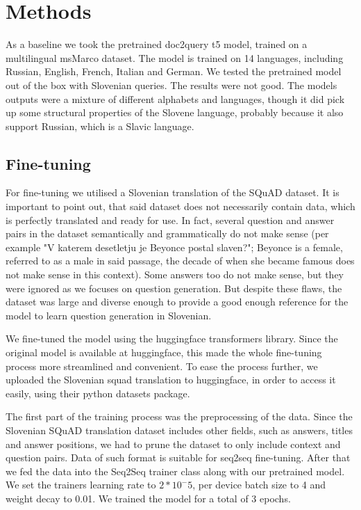 \documentclass[fleqn,moreauthors,10pt]{ds_report}
\makeatletter
\newcommand\setcurrentname[1]{\def\@currentlabelname{#1}}
\makeatother
\begin{document}

\section*{Methods} 
\setcurrentname{Methods}
\label{methods} %

As a baseline we took the pretrained doc2query t5 model, trained on a multilingual msMarco dataset\cite{msmarcomodel}. The model is trained on 14 languages, including Russian, English, French, Italian and German. We tested the pretrained model out of the box with Slovenian queries. The results were not good. The models outputs were a mixture of different alphabets and languages, though it did pick up some structural properties of the Slovene language, probably because it also support Russian, which is a Slavic language. 

\subsection*{Fine-tuning}
For fine-tuning we utilised a Slovenian translation of the SQuAD dataset\cite{slosquad}. It is important to point out, that said dataset does not necessarily contain data, which is perfectly translated and ready for use. In fact, several question and answer pairs in the dataset semantically and grammatically do not make sense (per example "V katerem desetletju je Beyonce postal slaven?"; Beyonce is a female, referred to as a male in said passage, the decade of when she became famous does not make sense in this context). Some answers too do not make sense, but they were ignored as we focuses on question generation. But despite these flaws, the dataset was large and diverse enough to provide a good enough reference for the model to learn question generation in Slovenian.

We fine-tuned the model using the huggingface transformers library. Since the original model is available at huggingface, this made the whole fine-tuning process more streamlined and convenient. To ease the process further, we uploaded the Slovenian squad translation to huggingface, in order to access it easily, using their python datasets package. 

The first part of the training process was the preprocessing of the data. Since the Slovenian SQuAD translation dataset includes other fields, such as answers, titles and answer positions, we had to prune the dataset to only include context and question pairs. Data of such format is suitable for seq2seq fine-tuning. After that we fed the data into the Seq2Seq trainer class along with our pretrained model. We set the trainers learning rate to $2*10^-5$, per device batch size to 4 and weight decay to 0.01. We trained the model for a total of 3 epochs.
\end{document}
